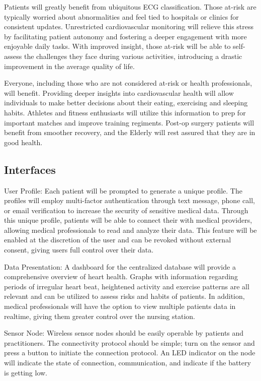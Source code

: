 \documentclass{article}
\begin{document}
Patients will greatly benefit from ubiquitous ECG classification. Those at-risk are typically worried about abnormalities and feel tied to hospitals or clinics for consistent updates. Unrestricted cardiovascular monitoring will relieve this stress by facilitating patient autonomy and fostering a deeper engagement with more enjoyable daily tasks. With improved insight, those at-risk will be able to self-assess the challenges they face during various activities, introducing a drastic improvement in the average quality of life. 

Everyone, including those who are not considered at-risk or health professionals, will benefit. Providing deeper insights into cardiovascular health will allow individuals to make better decisions about their eating, exercising and sleeping habits. Athletes and fitness enthusiasts will utilize this information to prep for important matches and improve training regiments. Post-op surgery patients will benefit from smoother recovery, and the Elderly will rest assured that they are in good health.

\subsection{Interfaces}
User Profile: Each patient will be prompted to generate a unique profile. The profiles will employ multi-factor authentication through text message, phone call, or email verification to increase the security of sensitive medical data. Through this unique profile, patients will be able to connect their with medical providers, allowing medical professionals to read and analyze their data. This feature will be enabled at the discretion of the user and can be revoked without external consent, giving users full control over their data.

Data Presentation: A dashboard for the centralized database will provide a comprehensive overview of heart health. Graphs with information regarding periods of irregular heart beat, heightened activity and exercise patterns are all relevant and can be utilized to assess risks and habits of patients. In addition, medical professionals will have the option to view multiple patients data in realtime, giving them greater control over the nursing station.

Sensor Node: Wireless sensor nodes should be easily operable by patients and practitioners. The connectivity protocol should be simple; turn on the sensor and press a button to initiate the connection protocol. An LED indicator on the node will indicate the state of connection, communication, and indicate if the battery is getting low.
\end{document}
